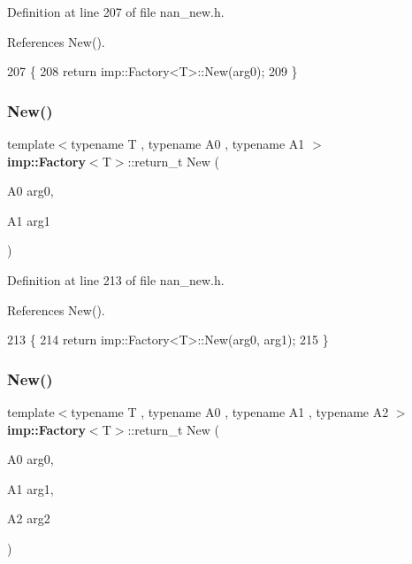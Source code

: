 Definition at line 207 of file nan\+\_\+new.\+h.



References New().


\begin{DoxyCode}
207              \{
208   \textcolor{keywordflow}{return} imp::Factory<T>::New(arg0);
209 \}
\end{DoxyCode}
\mbox{\label{nan__new_8h_a5ec5a92a66cbec2a73362dc063c3b73a}} 
\subsubsection{New()\hspace{0.1cm}{\footnotesize\ttfamily [3/22]}}
{\footnotesize\ttfamily template$<$typename T , typename A0 , typename A1 $>$ \\
\textbf{ imp\+::\+Factory}$<$T$>$\+::return\+\_\+t New (\begin{DoxyParamCaption}\item[{A0}]{arg0,  }\item[{A1}]{arg1 }\end{DoxyParamCaption})}



Definition at line 213 of file nan\+\_\+new.\+h.



References New().


\begin{DoxyCode}
213                       \{
214   \textcolor{keywordflow}{return} imp::Factory<T>::New(arg0, arg1);
215 \}
\end{DoxyCode}
\mbox{\label{nan__new_8h_a4a4ff2fbb1cd9e17c1da90b78ababd2d}} 
\subsubsection{New()\hspace{0.1cm}{\footnotesize\ttfamily [4/22]}}
{\footnotesize\ttfamily template$<$typename T , typename A0 , typename A1 , typename A2 $>$ \\
\textbf{ imp\+::\+Factory}$<$T$>$\+::return\+\_\+t New (\begin{DoxyParamCaption}\item[{A0}]{arg0,  }\item[{A1}]{arg1,  }\item[{A2}]{arg2 }\end{DoxyParamCaption})}



